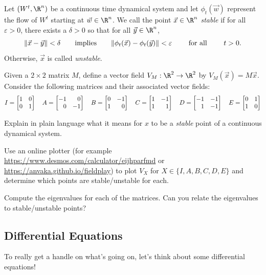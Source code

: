 	\newpage
	\begin{definition}
		Let $(W^t,\R^n)$ be a continuous time dynamical system and let $\phi_t(\vec w)$
		represent the flow of $W^t$ starting at $\vec w\in\R^n$. We call the point $\vec x\in \R^n$ \emph{stable}
		if for all $\varepsilon>0$, there exists a $\delta>0$ so that for all $\vec y\in \R^n$, 
		\[
			\lVert\vec x-\vec y\rVert < \delta\qquad \text{implies}\qquad
		\lVert\phi_t(\vec x)-\phi_t(\vec y)\rVert < \varepsilon \qquad \text{ for all }\qquad t > 0.
		\]
		Otherwise, $\vec x$ is called \emph{unstable}.
	\end{definition}

	\question
	Given a $2\times 2$ matrix $M$, define a vector field $V_M:\R^2\to\R^2$ by $V_M(\vec x)=M\vec x$. Consider the following matrices
	and their associated vector fields:
	\[
		I=\mat{1&0\\0&1}\quad
		A=\mat{-1&0\\0&-1}\quad
		B=\mat{0&-1\\1&0}\quad
		C=\mat{1&-1\\1&1}\quad
		D=\mat{-1&-1\\1&-1}\quad
		E=\mat{0&1\\1&0}
	\]
	\begin{parts}
		\item Explain in plain language what it means for $x$ to be a \emph{stable} point of a continuous
			dynamical system.
		\item Use an online plotter (for example \url{https://www.desmos.com/calculator/eijhparfmd} or
			\url{https://anvaka.github.io/fieldplay}) to
			plot $V_X$ for $X\in\{I,A,B,C,D,E\}$ and determine which points are stable/unstable for each.
		\item Compute the eigenvalues for each of the matrices. Can you relate the eigenvalues to 
			stable/unstable points?
	\end{parts}

	\newpage
	\subsection*{Differential Equations}
	To really get a handle on what's going on, let's think about some differential equations!

